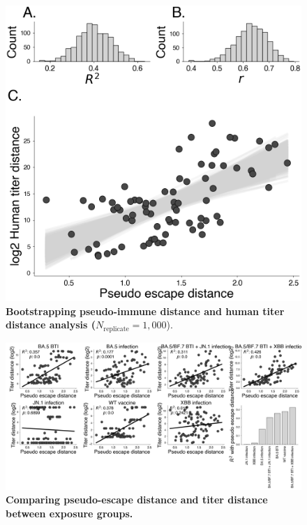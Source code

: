 \documentclass[11pt,oneside,letterpaper]{article}
\begin{document}
\begin{figure}[t!]
    \centering
    \includegraphics[width=1.0\textwidth=0.01]{./supplementary_figures/pseudo_escape_titer_correlation_bootstrap.png}
    \caption{
        \textbf{Bootstrapping pseudo-immune distance and human titer distance analysis ($N_{\text{replicate}}=1,000$}).
    }
    \label{fig:latent_immune_bootstrap}
\end{figure}

\begin{figure}[t!]
    \centering
    \includegraphics[width=1.0\textwidth=0.01]{./supplementary_figures/titer_pseudo_escape_distance_by_group.png}
    \caption{
        \textbf{Comparing pseudo-escape distance and titer distance between exposure groups.}
    }
    \label{fig:titer_distance_correlations_by_group}
\end{figure}
\end{document}
